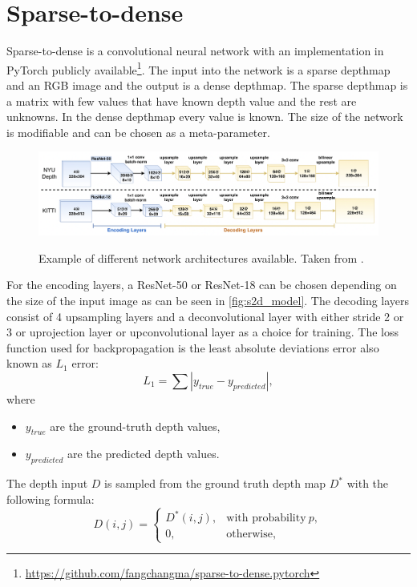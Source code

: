 \documentclass[twoside]{ctuthesis}
\theoremstyle{plain}
\theoremstyle{definition}
\theoremstyle{note}
\begin{document}
\section{Sparse-to-dense} \label{s2d}
Sparse-to-dense \cite{ma2018sparsetodense} is a convolutional neural network with an implementation in PyTorch publicly available\footnote{\url{https://github.com/fangchangma/sparse-to-dense.pytorch}}. The input into the network is a sparse depthmap and an RGB image and the output is a dense depthmap.  The sparse depthmap is a matrix with few values that have known depth value and the rest are unknowns. In the dense depthmap every value is known. The size of the network is modifiable and can be chosen as a meta-parameter.
\begin{figure}
	\caption[Example of different network architectures available.]{Example of different network architectures available. Taken from \cite{ma2018sparsetodense}.}
	\includegraphics[width=\textwidth]{sparse2dense.png}
	\centering
	\label{fig:s2d_model}
\end{figure}
For the encoding layers, a ResNet-50 or ResNet-18 can be chosen depending on the size of the input image as can be seen in \autoref{fig:s2d_model}. The decoding layers consist of 4 upsampling layers and a deconvolutional layer with either stride 2 or 3 or uprojection layer or upconvolutional layer as a choice for training. The loss function used for backpropagation is the least absolute deviations error also known as $L_1$ error:
\begin{equation}
	L_1=\sum|y_{true}-y_{predicted}|,
\end{equation}
where
\begin{itemize}
	\item $y_{true}$ are the ground-truth depth values,
	\item $y_{predicted}$ are the predicted depth values.
\end{itemize}
The depth input $D$ is sampled from the ground truth depth map $D^*$ with the following formula:
\begin{equation}
	D(i,j)=\begin{cases}
		D^*(i,j),&\text{with probability}\ p,\\
		0,&\text{otherwise},
	\end{cases}
\end{equation}
\end{document}
